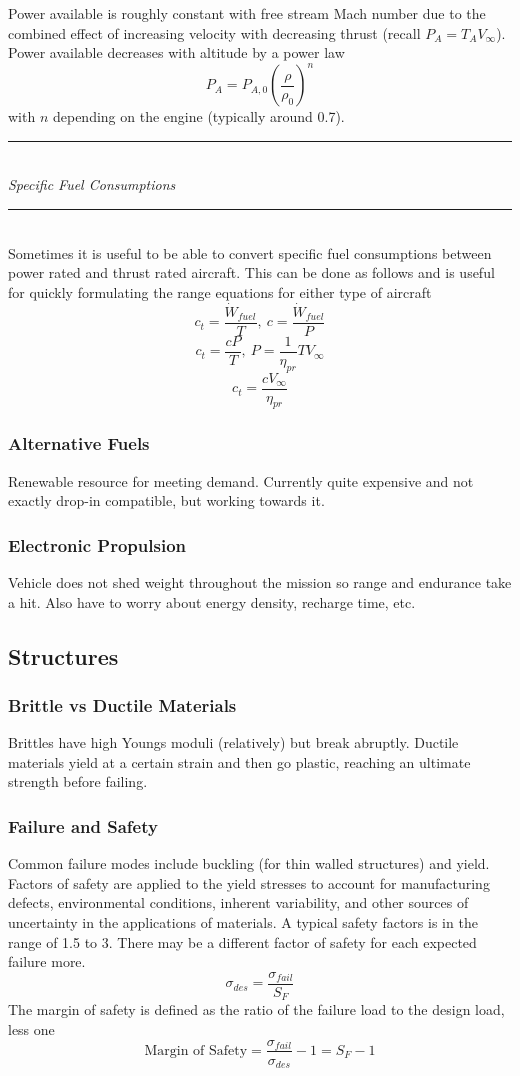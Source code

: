 \documentclass[11pt]{article}
\newcommand{\Header}[1]{\noindent\rule{\textwidth}{0.4pt}\\[0.3cm]\indent \large{\textit{#1}}\normalsize{}\\[-0.1cm]\noindent\rule{\textwidth}{0.4pt}}
\newcommand{\Vinfty}{V_\infty}
\begin{document}
Power available is roughly constant with free stream Mach number due to the combined effect of increasing velocity with decreasing thrust (recall $P_A=T_A\Vinfty$). Power available decreases with altitude by a power law
$$P_A=P_{A,0}\left(\frac{\rho}{\rho_0}\right)^n$$
with $n$ depending on the engine (typically around 0.7).\\

\Header{Specific Fuel Consumptions}\\

Sometimes it is useful to be able to convert specific fuel consumptions between power rated and thrust rated aircraft. This can be done as follows and is useful for quickly formulating the range equations for either type of aircraft
$$c_t = \frac{\dot{W}_{fuel}}{T},\ c = \frac{\dot{W}_{fuel}}{P}$$
$$c_t = \frac{cP}{T},\ P = \frac{1}{\eta_{pr}}T\Vinfty$$
$$c_t = \frac{c\Vinfty}{\eta_{pr}}$$

\subsubsection{Alternative Fuels}
Renewable resource for meeting demand. Currently quite expensive and not exactly drop-in compatible, but working towards it.
\subsubsection{Electronic Propulsion}
Vehicle does not shed weight throughout the mission so range and endurance take a hit. Also have to worry about energy density, recharge time, etc.

\subsection{Structures}
\subsubsection{Brittle vs Ductile Materials}
Brittles have high Youngs moduli (relatively) but break abruptly. Ductile materials yield at a certain strain and then go plastic, reaching an ultimate strength before failing.
\subsubsection{Failure and Safety}
Common failure modes include buckling (for thin walled structures) and yield. Factors of safety are applied to the yield stresses to account for manufacturing defects, environmental conditions, inherent variability, and other sources of uncertainty in the applications of materials. A typical safety factors is in the range of 1.5 to 3. There may be a different factor of safety for each expected failure more.
$$\sigma_{des} = \frac{\sigma_{fail}}{S_F}$$
The margin of safety is defined as the ratio of the failure load to the design load, less one
$$\textrm{Margin of Safety} = \frac{\sigma_{fail}}{\sigma_{des}}-1 = S_F-1$$
\end{document}
